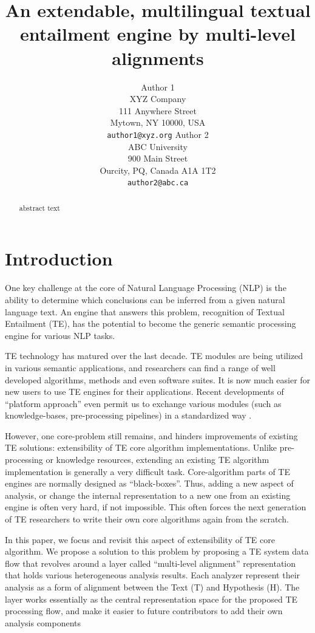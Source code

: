 \documentclass[11pt,letterpaper]{article}
\title{An extendable, multilingual textual entailment engine by
  multi-level alignments}
\author{Author 1\\
	    XYZ Company\\
	    111 Anywhere Street\\
	    Mytown, NY 10000, USA\\
	    {\tt author1@xyz.org}
	  \And
	Author 2\\
  	ABC University\\
  	900 Main Street\\
  	Ourcity, PQ, Canada A1A 1T2\\
  {\tt author2@abc.ca}}
\date{}
\begin{document}
\maketitle
\begin{abstract}
 abstract text 
\end{abstract}

\section{Introduction}
One key challenge at the core of Natural Language Processing (NLP) is
the ability to determine which conclusions can be inferred from a
given natural language text. An engine that answers this problem,
recognition of Textual Entailment (TE), has the potential to become
the generic semantic processing engine for various NLP tasks.    

TE technology has matured over the last decade. TE modules are being
utilized in various semantic applications, and researchers can
find a range of well developed algorithms, methods and even software
suites.
It is now much easier for new users to use TE engines for their
applications. Recent developments of ``platform approach'' even permit
us to exchange various modules (such as knowledge-bases,
pre-processing pipelines) in a standardized way \cite{}.    

However, one core-problem still remains, and hinders improvements of 
existing TE solutions: extensibility of TE core algorithm
implementations. Unlike pre-processing or knowledge resources, 
extending an existing TE algorithm implementation is generally a very
difficult task. Core-algorithm parts of TE engines are normally
designed as ``black-boxes''. Thus, adding a new aspect of analysis, or
change the internal representation to a new one from an existing
engine is often very hard, if not impossible. This often forces the
next generation of TE researchers to write their own core algorithms
again from the scratch.   

In this paper, we focus and revisit this aspect of extensibility of TE
core algorithm. We propose a solution to this problem by proposing a
TE system data flow that revolves around a layer called ``multi-level
alignment'' representation that holds various heterogeneous analysis
results. Each analyzer represent their analysis as a form of alignment
between the Text (T) and Hypothesis (H). The layer works essentially
as the central representation space for the proposed TE processing
flow, and make it easier to future contributors to add their own
analysis components
\end{document}
